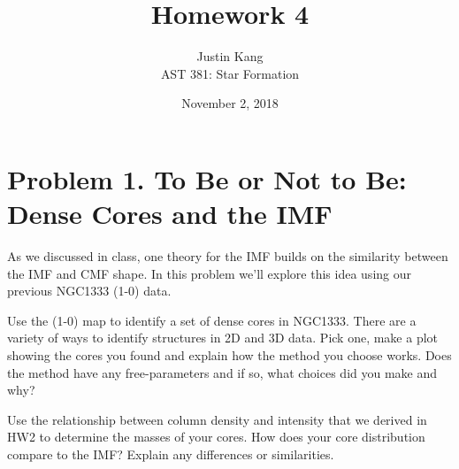 \documentclass[11pt]{article}
\title{\vspace{-2.5em} \textbf{Homework 4}}
\author{Justin Kang \\ AST 381: Star Formation}
\date{\vspace{-0.75em} November 2, 2018}
\newenvironment{tight_enumerate}{
    \begin{enumerate}[label=(\alph*)]
    \setlength{\itemsep}{3pt}
    \setlength{\parskip}{0pt}}
    {\end{enumerate}}
\begin{document}
\maketitle
\singlespacing
{}
\sloppy


\vspace{-2.5em}
\section*{Problem 1. To Be or Not to Be: Dense Cores and the IMF}
As we discussed in class, one theory for the IMF builds on the similarity between the IMF and CMF shape. In this problem we'll explore this idea using our previous NGC1333  (1-0) data.

\begin{tight_enumerate}
\item Use the  (1-0) map to identify a set of dense cores in NGC1333. There are a variety of ways to identify structures in 2D and 3D data. Pick one, make a plot showing the cores you found and explain how the method you choose works. Does the method have any free-parameters and if so, what choices did you make and why?

\item Use the relationship between column density and intensity that we derived in HW2 to determine the masses of your cores. How does your core distribution compare to the IMF? Explain any differences or similarities.
\end{tight_enumerate}
\end{document}
